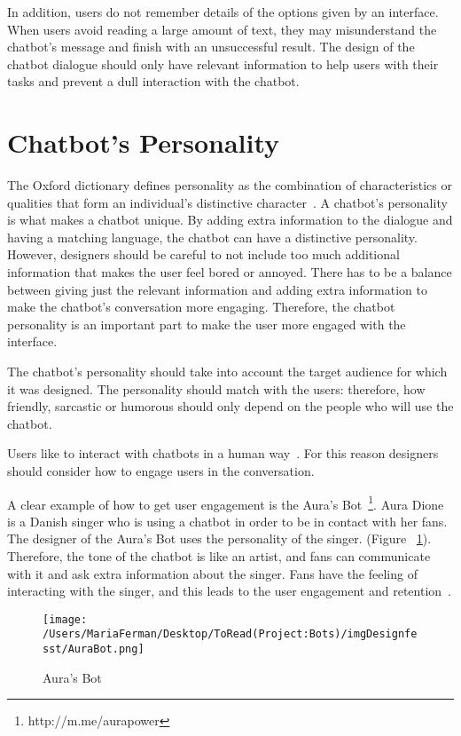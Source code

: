 \documentclass[a4paper,10pt]{article}
\begin{document}
In addition, users do not remember details of the options given by an interface. When users avoid reading a large amount of text, they may misunderstand the chatbot’s message and finish with an unsuccessful result. The design of the chatbot dialogue should only have relevant information to help users with their tasks and prevent a dull interaction with the chatbot. 

\section{Chatbot's Personality}

The Oxford dictionary defines personality as the combination of characteristics or qualities that form an individual's distinctive character~\cite{Oxford}. A chatbot’s personality is what makes a chatbot unique. By adding extra information to the dialogue and having a matching language, the chatbot can have a distinctive personality. However, designers should be careful to not include too much additional information that makes the user feel bored or annoyed. There has to be a balance between giving just the relevant information and adding extra information to make the chatbot's conversation more engaging. Therefore, the chatbot personality is an important part to make the user more engaged with the interface.

The chatbot’s personality should take into account the target audience for which it was designed. The personality should match with the users: therefore, how friendly, sarcastic or humorous should only depend on the people who will use the chatbot. 

Users like to interact with chatbots in a human way~\cite{HeuristicsWebPage}. For this reason designers should consider how to engage users in the conversation. 

A clear example of how to get user engagement is the Aura's Bot~\footnote{http://m.me/aurapower}. Aura Dione is a Danish singer who is using a chatbot in order to be in contact with her fans. The designer of the Aura's Bot uses the personality of the singer. (Figure ~\ref{FigureAura}). Therefore, the tone of the chatbot is like an artist, and fans can communicate with it and ask extra information about the singer. Fans have the feeling of interacting with the singer, and this leads to the user engagement and retention~\cite{personality}.  

\begin{figure}
\centering
\texttt{[image: /Users/MariaFerman/Desktop/ToRead(Project:Bots)/imgDesignfesst/AuraBot.png]}
\caption{Aura's Bot}
\label{FigureAura}
\end{figure}
\end{document}
